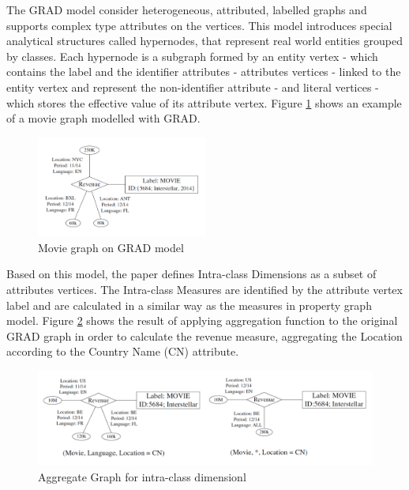 The GRAD model consider heterogeneous, attributed, labelled graphs and supports complex type attributes on the vertices. This model introduces special analytical structures called hypernodes, that represent real world entities grouped by classes. Each hypernode is a subgraph formed by an entity vertex - which contains the label and the identifier attributes - attributes vertices - linked to the entity vertex and represent the non-identifier attribute - and literal vertices - which stores the effective value of its attribute vertex. Figure \ref{fig:figure23} shows an example of a movie graph modelled with GRAD.

\begin{figure}[!h]
\centering
\includegraphics[width=0.5\textwidth]{../grad_model.png}
\caption{Movie graph on GRAD model \cite{ghrab2015framework}}
\label{fig:figure23}
\end{figure}

Based on this model, the paper defines Intra-class Dimensions as a subset of attributes vertices. The Intra-class Measures are identified by the attribute vertex label and are calculated in a similar way as the measures in property graph model. Figure \ref{fig:figure24} shows the result of applying aggregation function to the original GRAD graph in order to calculate the revenue measure, aggregating the Location according to the Country Name (CN) attribute.

\begin{figure}[!h]
\centering
\includegraphics[width=1\textwidth]{../intraclass_dimension.png}
\caption{Aggregate Graph for intra-class dimensionl \cite{ghrab2015framework}}
\label{fig:figure24}
\end{figure}

